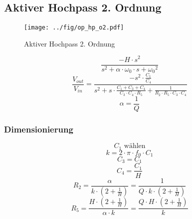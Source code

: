 



\subsection{Aktiver Hochpass 2. Ordnung}
\label{filt:o2-hp}
\begin{figure}[h!]
	\centering
	\texttt{[image: ../fig/op\_hp\_o2.pdf]}
	\caption{Aktiver Hochpass 2. Ordnung}
	\label{sch:op-hp-o2}
\end{figure}
\[ \frac{-H \cdot s^2}{s^2 + \alpha \cdot \omega_0 \cdot s + {\omega_0}^2} \]
\[ \frac{V_{out}}{V_{in}} = \frac{- s^2 \cdot \frac{C_1}{C_4}}
{s^2 + s \cdot \frac{C_1 + C_3 + C_4}{C_3 \cdot C_4 \cdot R_5} 
+ \frac{1}{R_2 \cdot R_5 \cdot C_3 \cdot C_4}} \]
\[ \alpha = \frac{1}{Q} \]
\subsubsection{Dimensionierung}
\[ C_1 \text{ wählen} \]
\[ k = 2 \cdot \pi \cdot f_0 \cdot C_1 \]
\[ C_3 = C_1 \]
\[ C_4 = \frac{C_1}{H} \]
\[ R_2 = \frac{\alpha}{k \cdot \left(2 + \frac{1}{H}\right)} 
= \frac{1}{Q \cdot k \cdot \left(2 + \frac{1}{H}\right)} \]
\[ R_5 = \frac{H \cdot \left(2 + \frac{1}{H}\right)}{\alpha \cdot k} 
= \frac{Q \cdot H \cdot \left(2 + \frac{1}{H}\right)}{k} \]

